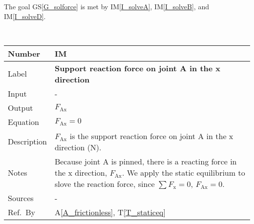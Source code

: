 \documentclass[12pt]{article}
\newcommand{\colAwidth}{0.13\textwidth}
\newcommand{\colBwidth}{0.82\textwidth}
\newcommand{\tref}[1]{T\ref{#1}}
\newcommand{\aref}[1]{A\ref{#1}}
\newcommand{\gsref}[1]{GS\ref{#1}}
\newcounter{instnum} %
\newcommand{\iref}[1]{IM\ref{#1}}
\begin{document}
The goal \gsref{G_solforce} is met by \iref{I_solveA}, \iref{I_solveB}, and 
\iref{I_solveD}.

~\newline


\noindent
\begin{minipage}{\textwidth}
	\renewcommand*{\arraystretch}{1.5}
	\begin{tabular}{| p{\colAwidth} | p{\colBwidth}|}
		\hline
		\rowcolor[gray]{0.9}
		Number& IM{instnum}\theinstnum \label{I_solveFax}\\
		\hline
		Label& \bf Support reaction force on joint A in the x direction\\
		\hline
		Input& - \\
		\hline
		Output& $F_{\text{{Ax}}}$ \\
		\hline
		Equation& $F_{\text{Ax}} = 0$ \\
		\hline
		Description&$F_{\text{Ax}}$ is the support reaction force on joint A 
		in the x direction (N). \\
		\hline
		Notes& Because joint A is pinned, there is a reacting force in the x 
		direction, $F_{\text{Ax}}$. We apply the static equilibrium to slove 
		the reaction force, since $\sum F_{\text{x}} = 0$, $F_{\text{Ax}} = 
		0$. 
		\\
		\hline
		Sources& - \\
		\hline
		Ref.\ By & \aref{A_frictionless}, \tref{T_staticeq} \\
		\hline
	\end{tabular}
\end{minipage}\\

~\newline
\end{document}

